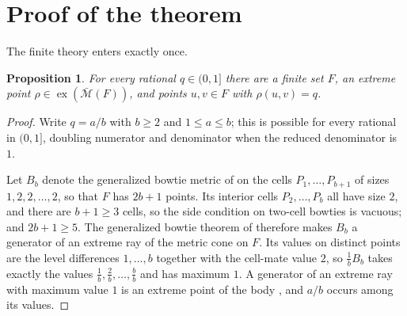 \documentclass[11pt]{article}
\newtheorem{proposition}[theorem]{Proposition}
\theoremstyle{definition}
\theoremstyle{remark}
\newcommand{\bM}{\bar{\mathcal{M}}}
\newcommand{\ex}{\operatorname{ex}}
\begin{document}
\section{Proof of the theorem}
\label{sec:proof}

The finite theory enters exactly once.

\begin{proposition}\label{prop:realize}
For every rational $q\in(0,1]$ there are a finite set $F$, an extreme point
$\rho\in\ex(\bM(F))$, and points $u,v\in F$ with $\rho(u,v)=q$.
\end{proposition}

\begin{proof}
Write $q=a/b$ with $b\geq 2$ and $1\leq a\leq b$; this is possible for every rational in
$(0,1]$, doubling numerator and denominator when the reduced denominator is $1$.

Let $B_b$ denote the generalized bowtie metric of \cite{FK-cone} on the cells
$P_1,\ldots,P_{b+1}$ of sizes $1,2,2,\ldots,2$, so that $F$ has $2b+1$ points. Its
interior cells $P_2,\ldots,P_b$ all have size $2$, and there are $b+1\geq 3$ cells, so the
side condition on two-cell bowties is vacuous; and $2b+1\geq 5$. The generalized bowtie
theorem of \cite{FK-cone} therefore makes $B_b$ a generator of an extreme ray of the metric
cone on $F$. Its values on distinct points are the level differences $1,\ldots,b$ together
with the cell-mate value $2$, so $\tfrac{1}{b}B_b$ takes exactly the values
$\tfrac1b,\tfrac2b,\ldots,\tfrac bb$ and has maximum $1$. A generator of an extreme ray with
maximum value $1$ is an extreme point of the body \cite{FK-cone}, and $a/b$ occurs among its
values.
\end{proof}
\end{document}
